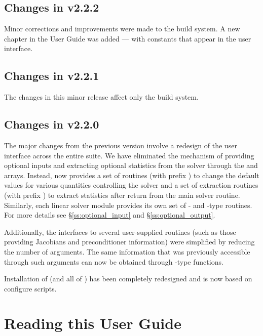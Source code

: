 \subsection*{Changes in v2.2.2}

Minor corrections and improvements were made to the build system.
A new chapter in the User Guide was added --- with constants that
appear in the user interface.

\subsection*{Changes in v2.2.1}

The changes in this minor {\sundials} release affect only the build system.

\subsection*{Changes in v2.2.0}

The major changes from the previous version involve a redesign of the
user interface across the entire {\sundials} suite. We have eliminated the
mechanism of providing optional inputs and extracting optional statistics 
from the solver through the  and  arrays. Instead,
{\ida} now provides a set of routines (with prefix )
to change the default values for various quantities controlling the
solver and a set of extraction routines (with prefix )
to extract statistics after return from the main solver routine.
Similarly, each linear solver module provides its own set of {-}
and {-type} routines. For more details see \S\ref{ss:optional_input}
and \S\ref{ss:optional_output}.

Additionally, the interfaces to several user-supplied routines
(such as those providing Jacobians and preconditioner information) 
were simplified by reducing the number
of arguments. The same information that was previously accessible
through such arguments can now be obtained through {-type}
functions.

Installation of {\ida} (and all of {\sundials}) has been completely 
redesigned and is now based on configure scripts.


\section{Reading this User Guide}\label{ss:reading}

